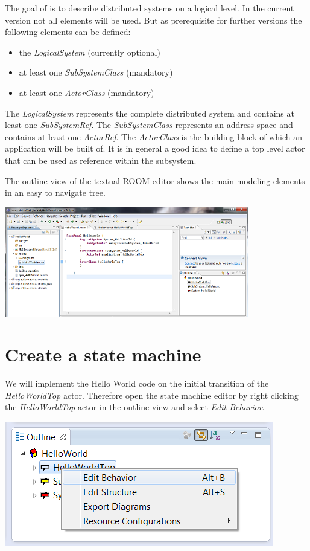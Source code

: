 The goal of \eTrice{} is to describe distributed systems on a logical level. In the current version not all 
elements will be used. But as prerequisite for further versions the following elements can be defined:
\begin{itemize}
\item the \textit{LogicalSystem} (currently optional)
\item at least one \textit{SubSystemClass} (mandatory)
\item at least one \textit{ActorClass} (mandatory)
\end{itemize}

The \textit{LogicalSystem} represents the complete distributed system and contains at least one 
\textit{SubSystemRef}. The \textit{SubSystemClass} represents an address space and contains at least one 
\textit{ActorRef}. The \textit{ActorClass} is the building block of which an application will be built of. 
It is in general a good idea to define a top level actor that can be used as reference within the subsystem.

The outline view of the textual ROOM editor shows the main modeling elements in an easy to navigate tree.

\includegraphics[width=0.8\textwidth]{images/015-HelloWorld02.png}


\section{Create a state machine}

We will implement the Hello World code on the initial transition of the \textit{HelloWorldTop} actor. 
Therefore open the state machine editor by right clicking the \textit{HelloWorldTop} actor in the outline 
view and select \textit{Edit Behavior}.

\includegraphics{images/015-HelloWorld03.png}

